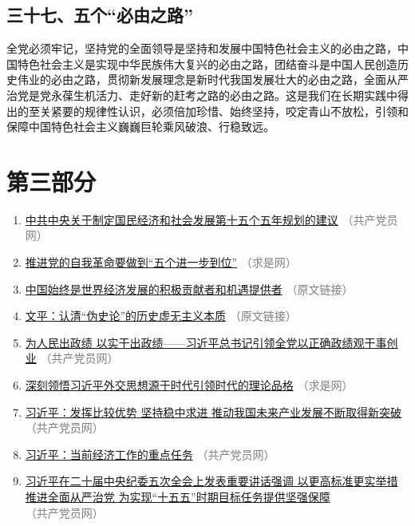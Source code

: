 \documentclass[UTF8,11pt,a4paper]{ctexart}
\begin{document}
\subsection*{三十七、五个“必由之路”}

全党必须牢记，坚持党的全面领导是坚持和发展中国特色社会主义的必由之路，中国特色社会主义是实现中华民族伟大复兴的必由之路，团结奋斗是中国人民创造历史伟业的必由之路，贯彻新发展理念是新时代我国发展壮大的必由之路，全面从严治党是党永葆生机活力、走好新的赶考之路的必由之路。这是我们在长期实践中得出的至关紧要的规律性认识，必须倍加珍惜、始终坚持，咬定青山不放松，引领和保障中国特色社会主义巍巍巨轮乘风破浪、行稳致远。

\section*{第三部分}

\begin{enumerate}[label=\textbf{材料示例\chinese*}, leftmargin=5.2em]
\item \href{https://www.12371.cn/2025/10/28/ARTI1761640401107119.shtml}{中共中央关于制定国民经济和社会发展第十五个五年规划的建议} \textcolor{gray}{（共产党员网）}
\item \href{https://www.qstheory.cn/20251129/5c573dc1d6574c5b8dd814e5403ae88e/c.html}{推进党的自我革命要做到“五个进一步到位”} \textcolor{gray}{（求是网）}
\item \href{https://mp.weixin.qq.com/s/XLDi-vArQj-8JXKCRT-6ZQ}{中国始终是世界经济发展的积极贡献者和机遇提供者} \textcolor{gray}{（原文链接）}
\item \href{https://mp.weixin.qq.com/s/1b_QMoc5TUANlYwCo6RIPA}{文平：认清“伪史论”的历史虚无主义本质} \textcolor{gray}{（原文链接）}
\item \href{https://www.12371.cn/2026/02/27/ARTI1772153945397806.shtml}{为人民出政绩 以实干出政绩——习近平总书记引领全党以正确政绩观干事创业} \textcolor{gray}{（共产党员网）}
\item \href{https://www.qstheory.cn/20260227/c77ea2492a464a9081e2330e2e906b6f/c.html}{深刻领悟习近平外交思想源于时代引领时代的理论品格} \textcolor{gray}{（求是网）}
\item \href{https://www.12371.cn/2026/01/31/ARTI1769849380447546.shtml}{习近平：发挥比较优势 坚持稳中求进 推动我国未来产业发展不断取得新突破} \textcolor{gray}{（共产党员网）}
\item \href{https://www.12371.cn/2026/02/15/ARTI1771139538258762.shtml}{习近平：当前经济工作的重点任务} \textcolor{gray}{（共产党员网）}
\item \href{https://www.12371.cn/2026/01/12/ARTI1768214272707593.shtml}{习近平在二十届中央纪委五次全会上发表重要讲话强调 以更高标准更实举措推进全面从严治党 为实现“十五五”时期目标任务提供坚强保障} \textcolor{gray}{（共产党员网）}
\end{enumerate}
\end{document}

